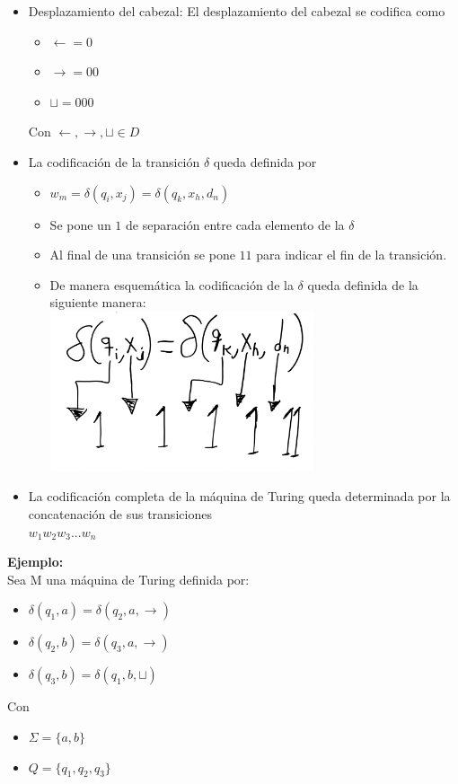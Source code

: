 \documentclass[letterpaper,10pt]{article}
\begin{document}
\begin{enumerate}
\begin{itemize}
       				\item Desplazamiento del cabezal: El desplazamiento del cabezal se codifica como
       					\begin{itemize}
       						\item $\leftarrow= 0$
       						\item $\rightarrow=00$
       						\item $\sqcup = 000$
       					\end{itemize} 
       				Con $\leftarrow , \rightarrow , \sqcup  \in D$
       				\item La codificación de la transición $\delta$ queda definida por
       					\begin{itemize}
       						\item $w_m=\delta(q_i,x_j)=\delta(q_k,x_h,d_n)$
       						\item Se pone un $1$ de separación entre cada elemento de la $\delta$
       						\item Al final de una transición se pone $11$ para indicar el fin de la transición.
       						\item De manera esquemática la codificación de la $\delta$ queda definida de la siguiente manera:\\
       							\includegraphics[width=220pt]{./images/img6.JPG}\\
       						 
       					\end{itemize}
       				\item La codificación completa de la máquina de Turing queda determinada por la concatenación de sus transiciones\\
       					$w_1w_2w_3...w_n$
       					
       			\end{itemize}
       			\textbf{Ejemplo:}\\
       				Sea M una  máquina de Turing definida por:
       				\begin{itemize}
       					\item $\delta (q_1,a) = \delta (q_2,a,\rightarrow)$
       					\item $\delta (q_2,b) = \delta (q_3,a,\rightarrow)$
       					\item $\delta (q_3,b) = \delta (q_1,b,\sqcup)$
       				\end{itemize}  
       				Con
       				\begin{itemize}
       					\item $\Sigma = \{a,b\}$
       					\item $Q=\{q_1,q_2,q_3\}$
       				\end{itemize}
       				

\end{enumerate}
\end{document}
